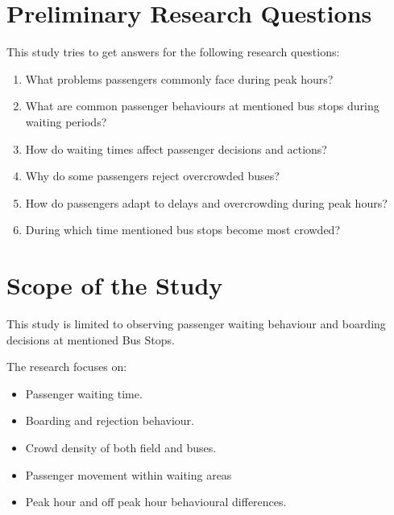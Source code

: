 \documentclass[12pt,a4paper]{report}
\begin{document}
\section{Preliminary Research Questions}

This study tries to get answers for the following research questions:

\begin{enumerate}[noitemsep]

\item What problems passengers commonly face during peak hours?

\item What are common passenger behaviours at mentioned bus stops during waiting periods?

\item How do waiting times affect passenger decisions and actions?

\item Why do some passengers reject overcrowded buses?

\item How do passengers adapt to delays and overcrowding during peak hours?

\item During which time mentioned bus stops become most crowded?

\end{enumerate}


\section{Scope of the Study}

This study is limited to observing passenger waiting behaviour and boarding decisions at
mentioned Bus Stops.

The research focuses on:

\begin{itemize}[noitemsep]

\item Passenger waiting time.

\item Boarding and rejection behaviour.

\item Crowd density of both field and buses.

\item Passenger movement within waiting areas

\item Peak hour and off peak hour behavioural differences.

\end{itemize}
\end{document}
